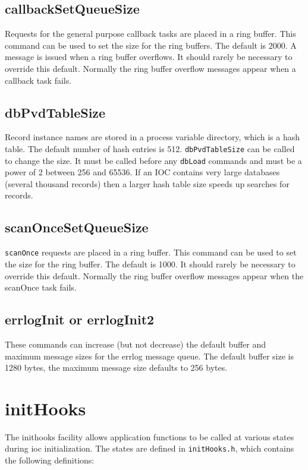 \subsection{callbackSetQueueSize}

Requests for the general purpose callback tasks are placed in a ring buffer.
This command can be used to set the size for the ring buffers.
The default is 2000.
A message is issued when a ring buffer overflows.
It should rarely be necessary to override this default.
Normally the ring buffer overflow messages appear when a callback task fails.

\subsection{dbPvdTableSize}

Record instance names are stored in a process variable directory, which is a hash table.
The default number of hash entries is 512.
\verb|dbPvdTableSize| can be called to change the size.
It must be called before any \verb|dbLoad| commands and must be a power of 2 between 256 and 65536.
If an IOC contains very large databases (several thousand records) then a larger hash table size speeds up searches for records.

\subsection{scanOnceSetQueueSize}

\verb|scanOnce| requests are placed in a ring buffer.
This command can be used to set the size for the ring buffer.
The default is 1000.
It should rarely be necessary to override this default.
Normally the ring buffer overflow messages appear when the scanOnce task fails.

\subsection{errlogInit or errlogInit2}

These commands can increase (but not decrease) the default buffer and maximum message sizes for the errlog message queue.
The default buffer size is 1280 bytes, the maximum message size defaults to 256 bytes.

\section{initHooks}

The inithooks facility allows application functions to be called at various states during ioc initialization.
The states are defined in \verb|initHooks.h|, which contains the following definitions:


